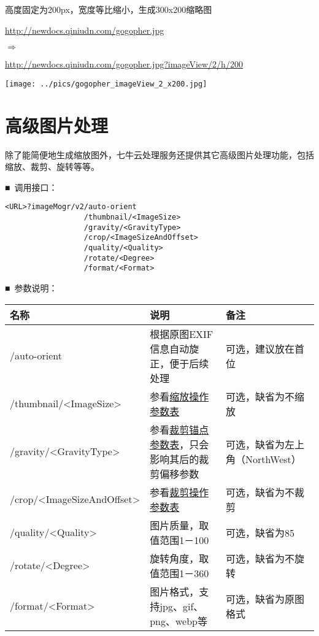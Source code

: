 \documentclass[11pt, oneside]{book}
\newcommand{\qsym}[1]{
\footnotesize
\noindent
#1\par
\normalsize
}
\newcommand{\qpara}[1]{
\vspace{0.3em}
\noindent
#1\par
\vspace{0.3em}
}
\newcommand{\qsamplelink}[1]{
\vspace{0.2em}
\noindent
#1\par
\vspace{0.1em}
}
\newcommand{\qurl}[1]{\footnotesize\url{#1}\normalsize}
\newcommand{\qtable}[1]{\footnotesize\vspace{0.5em}#1\vspace{0.5em}\normalsize}
\begin{document}
\begin{sample}
  \caption{高度固定为200px，宽度等比缩小，生成300x200缩略图}
    \qsamplelink{\qurl{http://newdocs.qiniudn.com/gogopher.jpg}}
    \qsym{$\Rightarrow$}
    \qsamplelink{\qurl{http://newdocs.qiniudn.com/gogopher.jpg?imageView/2/h/200}}

    \begin{center}
      \texttt{[image: ../pics/gogopher\_imageView\_2\_x200.jpg]}
    \end{center}
  \label{imageView-2-x200}
\end{sample}

\clearpage

\section{高级图片处理}

\qpara{除了能简便地生成缩放图外，七牛云处理服务还提供其它高级图片处理功能，包括缩放、裁剪、旋转等等。}
\qpara{■\ 调用接口：}
\begin{lstlisting}
<URL>?imageMogr/v2/auto-orient
                  /thumbnail/<ImageSize>
                  /gravity/<GravityType>
                  /crop/<ImageSizeAndOffset>
                  /quality/<Quality>
                  /rotate/<Degree>
                  /format/<Format>
\end{lstlisting}

\qpara{■\ 参数说明：}
\qtable{
\def\arraystretch{2}
\begin{tabular}{|l|p{13em}|p{10em}|}
\hline
名称 & 说明 & 备注\\
\hline
/auto-orient & 根据原图EXIF信息自动旋正，便于后续处理 & 可选，建议放在首位 \\
\hline
/thumbnail/\textless ImageSize\textgreater & 参看\hyperref[thumbnail-spec]{缩放操作参数表} & 可选，缺省为不缩放 \\
\hline
/gravity/\textless GravityType\textgreater & 参看\hyperref[crop-anchor-spec]{裁剪锚点参数表}，只会影响其后的裁剪偏移参数 & 可选，缺省为左上角（NorthWest） \\
\hline
/crop/\textless ImageSizeAndOffset\textgreater & 参看\hyperref[crop-spec]{裁剪操作参数表} & 可选，缺省为不裁剪 \\
\hline
/quality/\textless Quality\textgreater & 图片质量，取值范围1－100 & 可选，缺省为85 \\
\hline
/rotate/\textless Degree\textgreater & 旋转角度，取值范围1－360 & 可选，缺省为不旋转 \\
\hline
/format/\textless Format\textgreater & 图片格式，支持jpg、gif、png、webp等 & 可选，缺省为原图格式 \\
\hline
\end{tabular}
}
\end{document}
